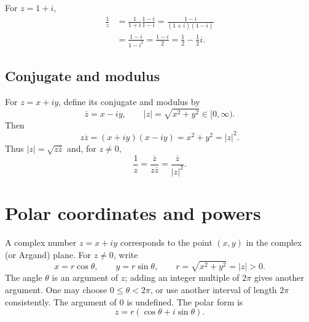 \begin{example}
For $z=1+i$,
\begin{align*}
 \frac1z
 &=\frac1{1+i}\frac{1-i}{1-i}
 =\frac{1-i}{(1+i)(1-i)}\\
 &=\frac{1-i}{1-i^2}
 =\frac{1-i}{2}=\frac12-\frac12i.
\end{align*}
\end{example}

\subsection{Conjugate and modulus}
For $z=x+iy$, define its conjugate and modulus by
\[
 \overline z=x-iy,\qquad |z|=\sqrt{x^2+y^2}\in[0,\infty).
\]
Then
\[
 z\overline z=(x+iy)(x-iy)=x^2+y^2=|z|^2.
\]
Thus $|z|=\sqrt{z\overline z}$ and, for $z\ne0$,
\[
 \boxed{\frac1z=\frac{\overline z}{z\overline z}
 =\frac{\overline z}{|z|^2}}.
\]

\section{Polar coordinates and powers}


A complex number $z=x+iy$ corresponds to the point $(x,y)$ in the complex
(or Argand) plane. For $z\ne0$, write
\[
 x=r\cos\theta,\qquad y=r\sin\theta,\qquad r=\sqrt{x^2+y^2}=|z|>0.
\]
The angle $\theta$ is an argument of $z$; adding an integer multiple of
$2\pi$ gives another argument. One may choose $0\le\theta<2\pi$, or use
another interval of length $2\pi$ consistently. The argument of $0$ is undefined.
The polar form is
\[
 z=r(\cos\theta+i\sin\theta).
\]

\begin{center}
\end{center}

